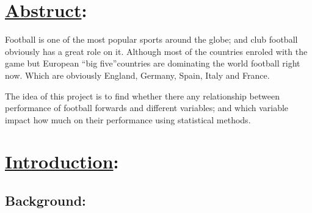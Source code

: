 \documentclass[12pt]{article}
\title{}
\author{}
\date{}
\begin{document}
\newpage


\section*{\underline{Abstruct}:}

Football is one of the most popular sports around the globe; and club football obviously has a great role on it. Although most of the countries enroled with the game but European \textquotedblleft big five\textquotedblright  countries are dominating the world football right now. Which are obviously England, Germany, Spain, Italy and France. 

The idea of this project is to find whether there any relationship between performance of football forwards and different variables; and which variable impact how much on their performance using statistical methods.

\section{\underline{Introduction}:}
\subsection{Background:}
\end{document}
